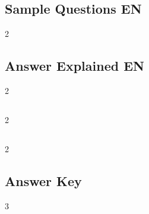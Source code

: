\iforigin

\subsection{Sample Questions EN}
\begin{multicols}{2}
	\raggedcolumns
		
\end{multicols}

\clearpage
\subsection{Answer Explained EN}	
\begin{multicols}{2}
	\raggedcolumns
		
\end{multicols}
\fi

\clearpage
\subsection{}
\begin{multicols}{2}
	\raggedcolumns
		
\end{multicols}


\clearpage
\subsection{}	
\begin{multicols}{2}
	\raggedcolumns
		
\end{multicols}



\clearpage
\subsection*{Answer Key}
\begin{multicols}{3}
			
\end{multicols}








%	

